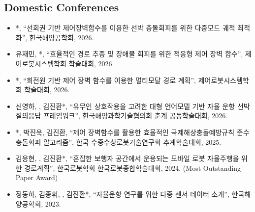 \documentclass[10pt, letterpaper]{article}
\begin{document}
    \subsection{Domestic Conferences} %
    \begin{itemize}
        \item {}*, “선회권 기반 제어장벽함수를 이용한 선박 충돌회피를 위한 다중모드 궤적 최적화”, 한국해양공학회, 2026.

            \vspace{0.2 cm}

        \item 유재민, *, “효율적인 경로 추종 및 장애물 회피를 위한 적응형 제어 장벽 함수”, 제어로봇시스템학회 학술대회, 2026.

            \vspace{0.2 cm}

        \item {}*, “회전원 기반 제어 장벽 함수를 이용한 멀티모달 경로 계획”, 제어로봇시스템학회 학술대회, 2026.

            \vspace{0.2 cm}

        \item 신영하, , 김진환*, “유무인 상호작용을 고려한 대형 언어모델 기반 자율 운항 선박 질의응답 프레임워크”, 한국해양과학기술협의회 춘계 공동학술대회, 2026.

            \vspace{0.2 cm}

        \item {}*, 박진욱, 김진환, “제어 장벽함수를 활용한 효율적인 국제해상충돌예방규칙 준수 충돌회피 알고리즘”, 한국 수중수상로봇기술연구회 추계학술대회, 2025.

            \vspace{0.2 cm}

        \item 김응현, , 김진환*, “혼잡한 보행자 공간에서 운용되는 모바일 로봇 자율주행을 위한 경로계획”, 한국로봇학회 한국로봇종합학술대회, 2024. (Most Outstanding Paper Award)
            
            \vspace{0.2 cm}
        
        \item 정동하, 김종휘, , 김진환*, “자율운항 연구를 위한 다중 센서 데이터 소개”, 한국해양공학회, 2023.
            

\end{itemize}
\end{document}
